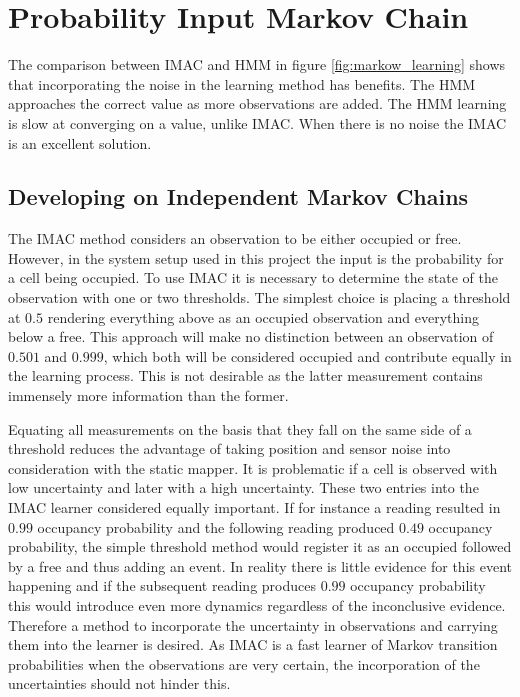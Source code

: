\section{Probability Input  Markov Chain}
\label{sec:pmac}
The comparison between IMAC and HMM in figure \ref{fig:markow_learning} shows that incorporating the noise in the learning method has benefits. The HMM approaches the correct value as more observations are added. The HMM learning is slow at converging on a value, unlike IMAC. When there is no noise the IMAC is an excellent solution. 

\subsection{Developing on Independent Markov Chains}
The IMAC method considers an observation to be either occupied or free. However, in the system setup used in this project the input is the probability for a cell being occupied. To use IMAC it is necessary to determine the state of the observation with one or two thresholds. The simplest choice is placing a threshold at $0.5$ rendering everything above as an occupied observation and everything below a free. This approach will make no distinction between an observation of $0.501$ and $0.999$, which both will be considered occupied and contribute equally in the learning process. This is not desirable as the latter measurement contains immensely more information than the former. 

Equating all measurements on the basis that they fall on the same side of a threshold reduces the advantage of taking position and sensor noise into consideration with the static mapper. 
It is problematic if a cell is observed with low uncertainty and later with a high uncertainty. 
These two entries into the IMAC learner considered equally important.
If for instance a reading resulted in $0.99$ occupancy probability and the following reading produced $0.49$ occupancy probability, the simple threshold method would register it as an occupied followed by a free and thus adding an event. 
In reality there is little evidence for this event happening and if the subsequent reading produces $0.99$ occupancy probability this would introduce even more dynamics regardless of the inconclusive evidence. 
Therefore a method to incorporate the uncertainty in observations and carrying them into the learner is desired. 
As IMAC is a fast learner of Markov transition probabilities when the observations are very certain, the incorporation of the uncertainties should not hinder this. 

